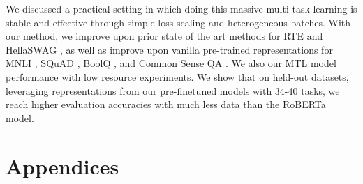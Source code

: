\documentclass[11pt,a4paper]{article}
\begin{document}
We discussed a practical setting in which doing this massive multi-task learning is stable and effective through simple loss scaling and heterogeneous batches. With our method, we improve upon prior state of the art methods for RTE \cite{rte} and HellaSWAG \cite{hellaswag}, as well as improve upon vanilla pre-trained representations for MNLI \cite{mnli}, SQuAD \cite{SQUAD}, BoolQ \cite{clark2019boolq}, and Common Sense QA \cite{commonsenseqa}. We also our MTL model performance with low resource experiments. We show that on held-out datasets, leveraging representations from our pre-finetuned models with 34-40 tasks, we reach higher evaluation accuracies with much less data than the RoBERTa model.
 
\clearpage




\appendix

\section{Appendices}
\end{document}
